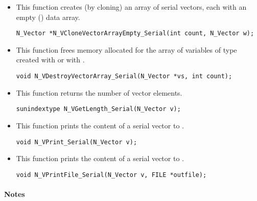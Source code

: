 \begin{itemize}
\item {}

 This function creates (by cloning) an array of  serial vectors, each with an
 empty () data array.

 

 \verb|N_Vector *N_VCloneVectorArrayEmpty_Serial(int count, N_Vector w);|


\item {}

 This function frees memory allocated for the array of  variables of type
  created with  or with
 .

 

 \verb|void N_VDestroyVectorArray_Serial(N_Vector *vs, int count);|


\item {}

 This function returns the number of vector elements.

 
 
 \verb|sunindextype N_VGetLength_Serial(N_Vector v);|


\item {}

 This function prints the content of a serial vector to .
 
 \verb|void N_VPrint_Serial(N_Vector v);|


\item {}

 This function prints the content of a serial vector to .
 
 \verb|void N_VPrintFile_Serial(N_Vector v, FILE *outfile);|

\end{itemize}
\paragraph{\bf Notes}                                                      
           
